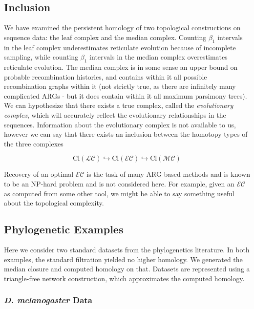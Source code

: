 \subsection{Inclusion}
%
We have examined the persistent homology of two topological constructions on sequence data: the leaf complex and the median complex.
Counting $\beta_1$ intervals in the leaf complex underestimates reticulate evolution because of incomplete sampling, while counting $\beta_1$ intervals in the median complex overestimates reticulate evolution.
The median complex is in some sense an upper bound on probable recombination histories, and contains within it all possible recombination graphs within it (not strictly true, as there are infinitely many complicated ARGs - but it does contain within it all maximum parsimony trees).
We can hypothesize that there exists a true complex, called the \emph{evolutionary complex}, which will accurately reflect the evolutionary relationships in the sequences.
Information about the evolutionary complex is not available to us, however we can say that there exists an inclusion between the homotopy types of the three complexes

\begin{equation}
 \mathrm{Cl}(\mathcal{LC}) \hookrightarrow \mathrm{Cl}(\mathcal{EC}) \hookrightarrow \mathrm{Cl}(\mathcal{MC})
\end{equation}

Recovery of an optimal $\mathcal{EC}$ is the task of many ARG-based methods and is known to be an NP-hard problem and is not considered here.
For example, given an $\mathcal{EC}$ as computed from some other tool, we might be able to say something useful about the topological complexity.

\subsection{Phylogenetic Examples}

Here we consider two standard datasets from the phylogenetics literature.
In both examples, the standard filtration yielded no higher homology.
We generated the median closure and computed homology on that.
Datasets are represented using a triangle-free network construction, which approximates the computed homology.

\subsubsection{{\textit{D. melanogaster}} Data}

